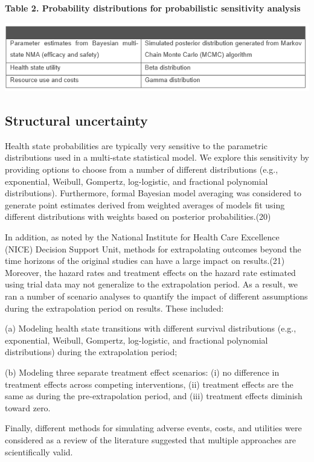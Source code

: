 \documentclass[11pt,final,fleqn]{article}\usepackage[]{graphicx}\usepackage[]{color}
\theoremstyle{plain}
\begin{document}
{\textbf{Table 2. Probability distributions for probabilistic sensitivity analysis } 

\includegraphics[scale=1]{Table 2.PNG} 

\subsection{Structural uncertainty}

Health state probabilities are typically very sensitive to the parametric distributions used in a multi-state statistical model. We explore this sensitivity by providing options to choose from a number of different distributions (e.g., exponential, Weibull, Gompertz, log-logistic, and fractional polynomial distributions). Furthermore, formal Bayesian model averaging was considered to generate point estimates derived from weighted averages of models fit using different distributions with weights based on posterior probabilities.(20)

In addition, as noted by the National Institute for Health Care Excellence (NICE) Decision Support Unit, methods for extrapolating outcomes beyond the time horizons of the original studies can have a large impact on results.(21) Moreover, the hazard rates and treatment effects on the hazard rate estimated using trial data may not generalize to the extrapolation period. As a result, we ran a number of scenario analyses to quantify the impact of different assumptions during the extrapolation period on results. These included: 

(a) Modeling health state transitions with different survival distributions (e.g., exponential, Weibull, Gompertz, log-logistic, and fractional polynomial distributions) during the extrapolation period;

(b) Modeling three separate treatment effect scenarios: (i) no difference in treatment effects across competing interventions, (ii) treatment effects are the same as during the pre-extrapolation period, and (iii) treatment effects diminish toward zero. 

Finally, different methods for simulating adverse events, costs, and utilities were considered as a review of the literature suggested that multiple approaches are scientifically valid.

}
\end{document}

